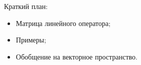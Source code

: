 
\begin{frame} %


\end{frame}



\begin{frame}{Краткий план:}
  \begin{itemize}[<+->]
    \item Матрица линейного оператора;
    \item Примеры;
    \item Обобщение на векторное пространство.
  \end{itemize}

\end{frame}


